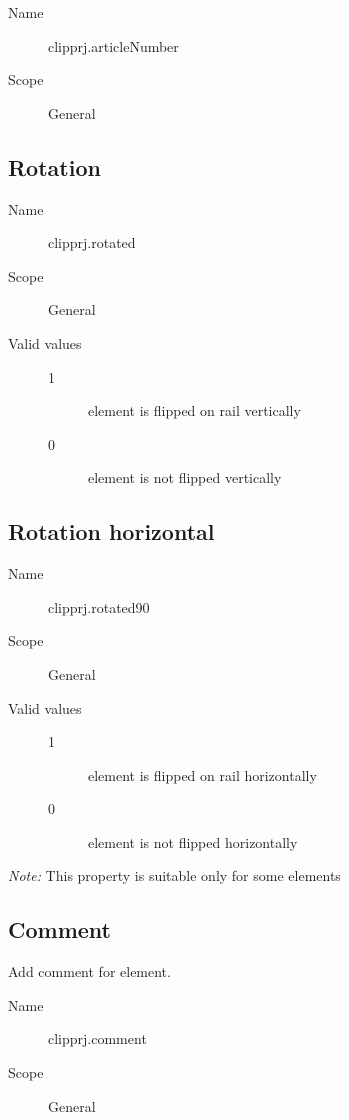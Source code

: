 \documentclass[%
	a4paper,
	oneside,
	listof=numbered,
	parskip=half,
	headsepline=true,
	footsepline=true,
	]{scrbook}
\begin{document}
\begin{description}
	\item[Name] clipprj.articleNumber
	\item[Scope] General
\end{description}

\subsection{Rotation}

\begin{description}
	\item[Name] clipprj.rotated
	\item[Scope] General
	\item[Valid values]
	\begin{description}
		\item[1] element is flipped on rail vertically
		\item[0] element is not flipped vertically
	\end{description}
\end{description}

\subsection{Rotation horizontal}

\begin{description}
	\item[Name] clipprj.rotated90
	\item[Scope] General
	\item[Valid values]
	\begin{description}
		\item[1] element is flipped on rail horizontally
		\item[0] element is not flipped horizontally
	\end{description}
\end{description}

\emph{Note:} This property is suitable only for some elements

\subsection{Comment}

Add comment for element.

\begin{description}
	\item[Name] clipprj.comment
	\item[Scope] General
\end{description}
\end{document}
